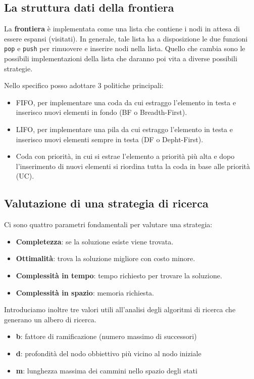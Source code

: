 \subsection{La struttura dati della frontiera}
La \textbf{frontiera} \`e implementata come una lista che contiene i nodi in attesa di essere
espansi (visitati). In generale, tale lista ha a disposizione le due funzioni \verb|pop| e
\verb|push| per rimuovere e inserire nodi nella lista. Quello che cambia sono le possibili
implementazioni della lista che daranno poi vita a diverse possibili strategie.

Nello specifico posso adottare 3 politiche principali:
\begin{itemize}
	\item FIFO, per implementare una coda da cui estraggo l'elemento in testa e inserisco
	      nuovi elementi in fondo (BF o Breadth-First).
	\item LIFO, per implementare una pila da cui estraggo l'elemento in testa e inserisco nuovi
	      elementi sempre in testa (DF o Depht-First).
	\item Coda con priorit\`a, in cui si estrae l'elemento a priorit\`a pi\`u alta e dopo
	      l'inserimento di nuovi elementi si riordina tutta la coda in base alle priorit\`a
	      (UC).
\end{itemize}

\subsection{Valutazione di una strategia di ricerca}
Ci sono quattro parametri fondamentali per valutare una strategia:
\begin{itemize}
	\item \textbf{Completezza}: se la soluzione esiste viene trovata.
	\item \textbf{Ottimalit\`a}: trova la soluzione migliore con costo minore.
	\item \textbf{Complessit\`a in tempo}: tempo richiesto per trovare la soluzione.
	\item \textbf{Complessit\`a in spazio}: memoria richiesta.
\end{itemize}
Introduciamo inoltre tre valori utili all'analisi degli algoritmi di ricerca che generano
un albero di ricerca.
\begin{itemize}
	\item \textbf b: fattore di ramificazione (numero massimo di successori)
	\item \textbf d: profondit\`a del nodo obbiettivo pi\`u vicino al nodo iniziale
	\item \textbf m: lunghezza massima dei cammini nello spazio degli stati
\end{itemize}

